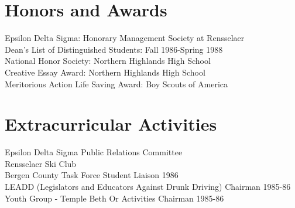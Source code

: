 \documentclass[10pt]{resume}
\begin{document}
\section{Honors and Awards}          
Epsilon Delta Sigma: Honorary Management Society at          
Rensselaer    \\      
Dean's List of Distinguished Students: Fall 1986-Spring 1988  \\        
National Honor Society: Northern Highlands High School  \\        
Creative Essay Award: Northern Highlands High School  \\        
Meritorious Action Life Saving Award: Boy Scouts of America          
 
\section{Extracurricular Activities}          
Epsilon Delta Sigma Public Relations Committee \\         
Rensselaer Ski Club     \\     
Bergen County Task Force Student Liaison 1986  \\        
LEADD (Legislators and Educators Against Drunk Driving) Chairman
1985-86  \\        
Youth Group - Temple Beth Or Activities Chairman 1985-86          
\end{document}
